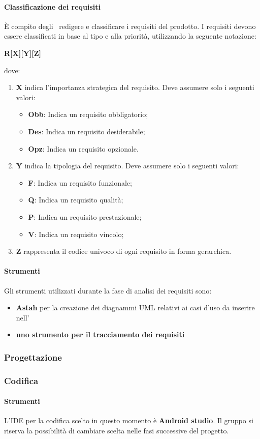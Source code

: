 \documentclass[../NormeProgetto.tex]{subfiles}
\begin{document}
			\paragraph{Classificazione dei requisiti}
			È compito degli \analisti\ redigere e classificare i requisiti del prodotto.  I requisiti devono essere classificati in base al tipo e alla priorità, utilizzando la seguente notazione:
			\begin{center}\textbf{R[X][Y][Z]}\end{center} dove:
				\begin{enumerate}
					\item \textbf{X} indica l'importanza strategica del requisito. Deve assumere solo i seguenti valori:
						\begin{itemize}
							\item \textbf{Obb}: Indica un requisito obbligatorio;
							\item \textbf{Des}: Indica un requisito desiderabile;
							\item \textbf{Opz}: Indica un requisito opzionale.
						\end{itemize}
					\item \textbf{Y} indica la tipologia del requisito. Deve assumere solo i seguenti valori:
						\begin{itemize}
							\item \textbf{F}: Indica un requisito funzionale;
							\item \textbf{Q}: Indica un requisito qualità;
							\item \textbf{P}: Indica un requisito prestazionale;
							\item \textbf{V}: Indica un requisito vincolo;
						\end{itemize}
					\item \textbf{Z} rappresenta il codice univoco di ogni requisito in forma gerarchica.
				\end{enumerate}
			\paragraph{Strumenti}
			Gli strumenti utilizzati durante la fase di analisi dei requisiti sono:
			\begin{itemize}
				\item \textbf{Astah} per la creazione dei diagnammi UML relativi ai casi d'uso da inserire nell'\analisideirequisiti\
				\item \textbf{uno strumento per il tracciamento dei requisiti}
			\end{itemize}
		\subsubsection{Progettazione}
		\subsubsection{Codifica}
			\paragraph{Strumenti}
			L'IDE per la codifica scelto in questo momento è \textbf{Android studio}. Il gruppo si riserva la possibilità di cambiare scelta nelle fasi successive del progetto.
\end{document}
